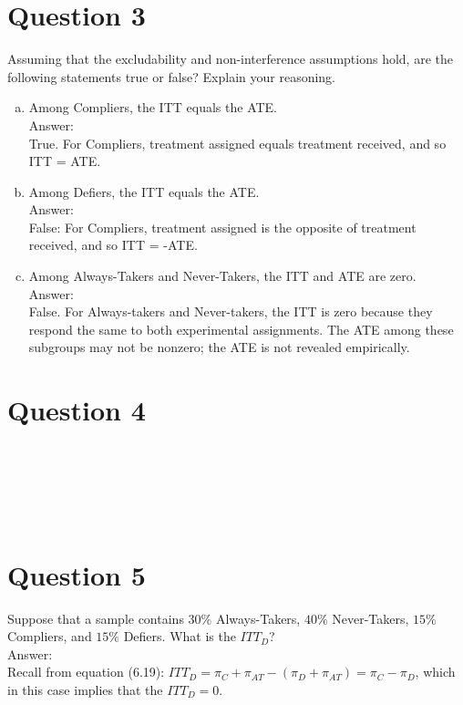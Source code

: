 \documentclass[11pt,notitlepage]{article}\usepackage[]{graphicx}\usepackage[]{color}
\makeatletter
\newenvironment{kframe}{%
 \def\at@end@of@kframe{}%
 \ifinner\ifhmode%
  \def\at@end@of@kframe{\end{minipage}}%
  \begin{minipage}{\columnwidth}%
 \fi\fi%
 \def\FrameCommand##1{\hskip\@totalleftmargin \hskip-\fboxsep
 \colorbox{shadecolor}{##1}\hskip-\fboxsep
     \hskip-\linewidth \hskip-\@totalleftmargin \hskip\columnwidth}%
 \MakeFramed {\advance\hsize-\width
   \@totalleftmargin\z@ \linewidth\hsize
   \@setminipage}}%
 {\par\unskip\endMakeFramed%
 \at@end@of@kframe}
\newenvironment{knitrout}{}{} %
\makeatother
\begin{document}
\section*{Question 3}
Assuming that the excludability and non-interference assumptions hold, are the following statements true or false? Explain your reasoning.
\begin{enumerate}[a)]
\item Among Compliers, the ITT equals the ATE. \\
Answer:\\
True. For Compliers, treatment assigned equals treatment received, and so ITT = ATE.
\item Among Defiers, the ITT equals the ATE.\\
Answer:\\
False:  For Compliers, treatment assigned is the opposite of treatment received, and so ITT = -ATE.
\item Among Always-Takers and Never-Takers, the ITT and ATE are zero.\\
Answer: \\
False. For Always-takers and Never-takers, the ITT is zero because they respond the same to both experimental assignments. The ATE among these subgroups may not be nonzero; the ATE is not revealed empirically.
\end{enumerate}

\section*{Question 4}
\begin{knitrout}
\color{fgcolor}\begin{kframe}
\begin{verbatim}






\end{verbatim}
\end{kframe}
\end{knitrout}


\section*{Question 5}
Suppose that a sample contains $30\%$ Always-Takers, $40\%$ Never-Takers, $15\%$ Compliers, and $15\%$ Defiers. What is the $ITT_D$? \\
Answer:\\
Recall from equation (6.19): $ITT_D= \pi_{C}+ \pi_{AT}- (\pi_{D} + \pi_{AT}) = \pi_{C}- \pi_{D}$, which in this case implies that the $ITT_D = 0$.
\end{document}
